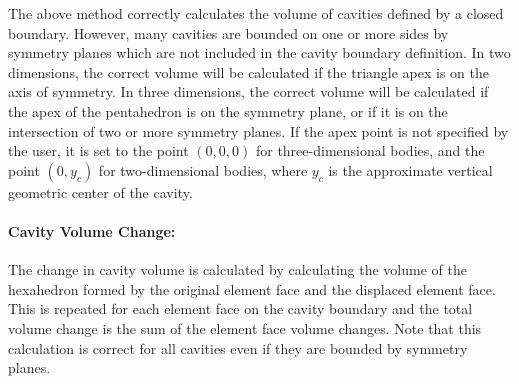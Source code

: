 The above method correctly calculates the volume of cavities defined by
a closed boundary.  However, many cavities are bounded on one or more
sides by symmetry planes which are not included in the cavity boundary
definition.  In two dimensions, the correct volume will be calculated if
the triangle apex is on the axis of symmetry.  In three dimensions, the
correct volume will be calculated if the apex of the pentahedron is on
the symmetry plane, or if it is on the intersection of two or more
symmetry planes.  If the apex point is not specified  by the user, it is
set to the point $(0,0,0)$ for three-dimensional bodies, and the point
$(0,y_c)$ for two-dimensional bodies, where $y_c$ is the approximate
vertical geometric center of the cavity.

\paragraph*{Cavity Volume Change:}
The change in cavity volume is calculated by calculating the volume of
the hexahedron formed by the original element face and the displaced
element face.  This is repeated for each element face on the cavity
boundary and the total volume change is the sum of the element face
volume changes.  Note that this calculation is correct for all cavities
even if they are bounded by symmetry planes.

